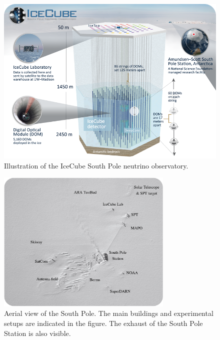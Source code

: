 \begin{figure}
\centering
\includegraphics[width=\textwidth]{chapter5/img/icecube_detector_sm.png}
\caption{Illustration of the IceCube South Pole neutrino observatory.}
\label{fig:ICgeometry}
\end{figure} 

\begin{figure}
\centering
\includegraphics[width=0.75\textwidth]{chapter5/img/SouthPole_3.jpg}
\caption{Aerial view of the South Pole. The main buildings and experimental setups are indicated in the figure. The exhaust of the South Pole Station is also visible.}
\label{fig:aerialview}
\end{figure} 

